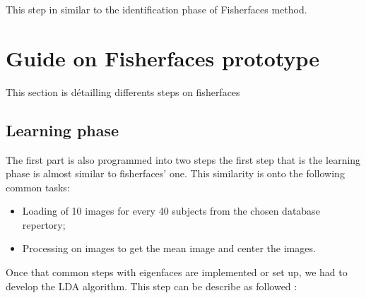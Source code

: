This step in similar to the identification phase of Fisherfaces method.


 




\clearpage
\section{Guide on Fisherfaces prototype}
This section is détailling differents steps on fisherfaces

\subsection{Learning phase}
The first part is also programmed into two steps the first step that is the learning phase is almost similar to fisherfaces' one. This similarity is onto the following common tasks:
\begin{itemize}
\item Loading of 10 images for every 40 subjects from the chosen database repertory;
\item Processing on images to get the mean image and center the images.

\end{itemize}

Once that common steps with eigenfaces are implemented or set up, we had to develop the LDA algorithm. This step can be describe as followed :
